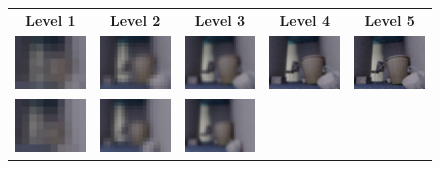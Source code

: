 \begin{figure}
    \setlength\tabcolsep{2.5pt}
    \begin{center}
        \begin{tabular}{c c c c c}
        \textbf{Level 1} & \textbf{Level 2} & \textbf{Level 3} & \textbf{Level 4} & \textbf{Level 5} \\
        \includegraphics[width=2.2cm]{main/chapter03/data/depth/img_i_1.jpg} &
        \includegraphics[width=2.2cm]{main/chapter03/data/depth/img_i_2.jpg} &
        \includegraphics[width=2.2cm]{main/chapter03/data/depth/img_i_3.jpg} &
        \includegraphics[width=2.2cm]{main/chapter03/data/depth/img_i_4.jpg} &
        \includegraphics[width=2.2cm]{main/chapter03/data/depth/img_i_5.jpg} \\
        \includegraphics[width=2.2cm]{main/chapter03/data/depth/img_j_1.jpg} &
        \includegraphics[width=2.2cm]{main/chapter03/data/depth/img_j_2.jpg} &
        \includegraphics[width=2.2cm]{main/chapter03/data/depth/img_j_3.jpg} &

\end{tabular}
\end{center}
\end{figure}
